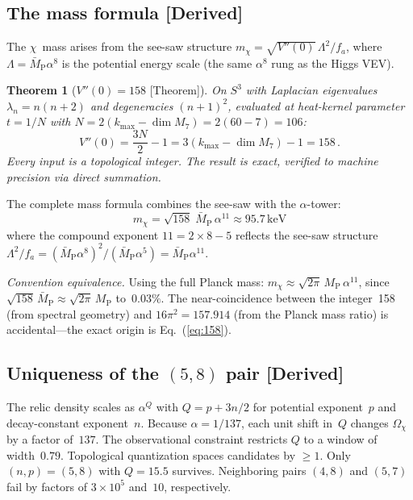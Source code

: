 \documentclass[aps,prd,twocolumn,superscriptaddress,showpacs,floatfix,nofootinbib]{revtex4-2}
\newtheorem{theorem}{Theorem}
\theoremstyle{definition}
\theoremstyle{remark}
\newcommand{\Sph}{S}
\newcommand{\MP}{M_{\mathrm{P}}}
\newcommand{\MPbar}{\bar{M}_{\mathrm{P}}}
\newcommand{\keV}{\,\mathrm{keV}}
\newcommand{\kmax}{k_{\max}}
\newcommand{\grade}[1]{\textsf{\footnotesize [#1]}}
\begin{document}
\subsection{The mass formula \grade{Derived}}

The $\chi$~mass arises from the see-saw structure
$m_\chi = \sqrt{V''(0)}\,\Lambda^2/f_a$, where
$\Lambda = \MPbar\alpha^8$ is the potential energy scale
(the same $\alpha^8$ rung as the Higgs VEV).

\begin{theorem}[$V''(0) = 158$ \grade{Theorem}]
\label{thm:158}
On $\Sph^3$ with Laplacian eigenvalues $\lambda_n=n(n{+}2)$
and degeneracies $(n{+}1)^2$, evaluated at heat-kernel
parameter $t=1/N$ with $N=2(\kmax{-}\dim M_7)
=2(60{-}7)=106$:
\begin{equation}
\label{eq:158}
V''(0) = \frac{3N}{2}-1 = 3(\kmax-\dim M_7)-1 = 158\,.
\end{equation}
Every input is a topological integer. The result is exact,
verified to machine precision via direct summation.
\end{theorem}

The complete mass formula combines the see-saw with the
$\alpha$-tower:
\begin{equation}
\label{eq:mchi}
\boxed{m_\chi = \sqrt{158}\;\MPbar\,\alpha^{11}
\approx 95.7\keV}
\end{equation}
where the compound exponent $11 = 2\times 8 - 5$ reflects
the see-saw structure $\Lambda^2/f_a
= (\MPbar\alpha^8)^2/(\MPbar\alpha^5)
= \MPbar\alpha^{11}$.

\emph{Convention equivalence.} Using the full Planck mass:
$m_\chi \approx \sqrt{2\pi}\,\MP\,\alpha^{11}$, since
$\sqrt{158}\,\MPbar \approx \sqrt{2\pi}\,\MP$ to~$0.03\%$.
The near-coincidence between the integer~158 (from
spectral geometry) and $16\pi^2=157.914$ (from the Planck
mass ratio) is accidental---the exact origin is
Eq.~(\ref{eq:158}).

\subsection{Uniqueness of the $(5,8)$ pair \grade{Derived}}

The relic density scales as $\alpha^Q$ with
$Q = p + 3n/2$ for potential exponent~$p$ and
decay-constant exponent~$n$. Because $\alpha=1/137$,
each unit shift in~$Q$ changes $\Omega_\chi$ by a factor
of~$137$. The observational constraint restricts $Q$ to
a window of width~$0.79$. Topological quantization spaces
candidates by $\geq 1$. Only $(n,p)=(5,8)$ with $Q=15.5$
survives. Neighboring pairs $(4,8)$ and $(5,7)$ fail by
factors of $3\times 10^5$ and~$10$, respectively.
\end{document}
